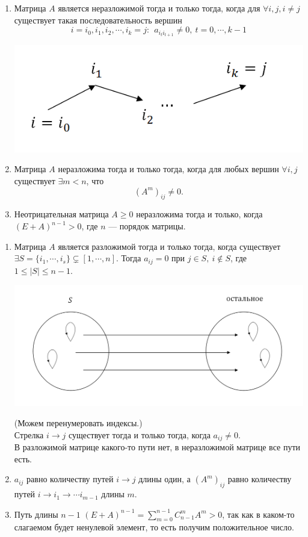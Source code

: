 \documentclass[12pt]{article}
\theoremstyle{definition}
\numberwithin{equation}{section}
\begin{document}
\begin{enumerate}
    \item Матрица $A$ является неразложимой тогда и только тогда, когда для $\forall i, j, i\neq j$ существует такая последовательность вершин $$i=i_0, i_1, i_2, \cdots, i_k=j:~~a_{i_t i_{t+1}}\neq 0,~t=0, \cdots, k-1$$
    \begin{center}
\includegraphics[scale=0.6]{l14_2.png}\\
\end{center}
\item Матрица $A$ неразложима тогда и только тогда, когда для любых вершин $\forall i, j$ существует $\exists m<n$, что $$(A^m)_{ij}\neq 0.$$
\item Неотрицательная матрица $A\geqslant 0$ неразложима тогда и только, когда $(E+A)^{n-1}>0$, где $n$ --- порядок матрицы. 
\end{enumerate}
\begin{enumerate}
    \item Матрица $A$ является разложимой тогда и только тогда, когда существует $\exists S=\{i_1,\cdots, i_s\} \subsetneq [1, \cdots, n]$. Тогда $a_{ij}=0$ при $j\in S,~i\notin S$, где $1\leqslant |S| \leqslant n-1$.\\
     \begin{center}
\includegraphics[scale=0.6]{l14_3.png}\\
\end{center}
    (Можем перенумеровать индексы.)\\
    Стрелка $i\to j$ существует тогда и только тогда, когда $a_{ij}\neq 0$.\\
    В разложимой матрице какого-то пути нет, в неразложимой матрице все пути есть.
\item $a_{ij}$ равно количеству путей $i\to j$ длины один, а $(A^m)_{ij}$ равно количеству путей $i\to i_1\to \cdots i_{m-1}$ длины $m$.
\item Путь длины $n-1$ $(E+A)^{n-1}=\sum\limits_{m=0}^{n-1}C_{n-1}^mA^m>0$, так как в каком-то слагаемом будет ненулевой элемент, то есть получим положительное число. 
\end{enumerate}
\end{document}
